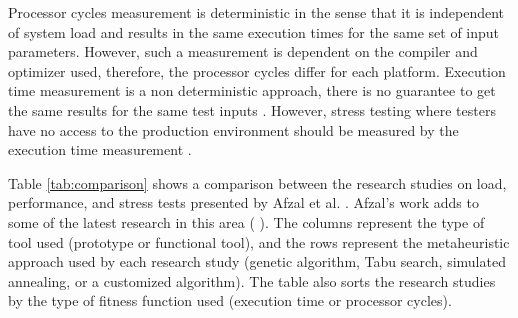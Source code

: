 \documentclass[times]{stvrauth}
\begin{document}
Processor cycles measurement is deterministic in the sense that it is independent of system load and results in the same execution times for the same set of input parameters. However, such a measurement is dependent on the compiler and optimizer used, therefore, the processor cycles differ for each platform. Execution time measurement is a non deterministic approach, there is no guarantee to get the same results for the same test inputs \cite{Afzal2009a}.  However, stress testing where testers have no access to the production environment should be measured by the execution time measurement \cite{Molyneaux2009} \cite{Afzal2009a}.

Table \ref{tab:comparison}  shows a comparison between the research studies on load, performance, and stress tests presented by Afzal et al. \cite{Afzal2009}. Afzal's work adds to some of the latest research in this area (\cite{Garousi2006} \cite{Garousi2010} \cite{DiAlesio2013} \cite{DiAlesio2014} \cite{Alesio2015} \cite{Gois2016} ). The columns represent the type of tool used (prototype or functional tool), and the rows represent the metaheuristic approach used by each research study (genetic algorithm, Tabu search, simulated annealing, or a customized algorithm). The table also sorts the research studies by the type of fitness function used (execution time or processor cycles). 
\end{document}
